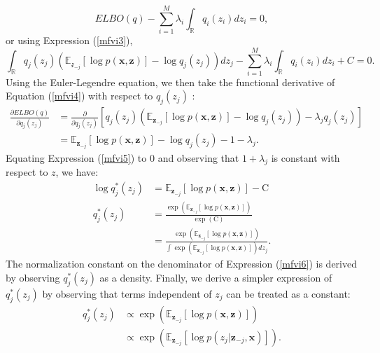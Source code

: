 \documentclass[honours,12pt]{unswthesis}
\newcommand{\R}{\mathbb{R}}
\numberwithin{equation}{section}
\theoremstyle{definition}
\begin{document}
\begin{equation*}
ELBO(q)-\sum^M_{i=1}\lambda_i\int_\R q_i(z_i)dz_i=0,
\end{equation*}
or using Expression (\ref{mfvi3}),
\begin{equation}
\int_\R q_j(z_j)\left(\mathbb{E}_{\mathcal{z}_{-j}}[\log p(\bm{x},\bm{z})]-\log q_j(z_j)\right)dz_j-\sum^M_{i=1}\lambda_i\int_\R q_i(z_i)dz_i+C=0. \label{mfvi4}
\end{equation} 
Using the Euler-Legendre equation, we then take the functional derivative of Equation (\ref{mfvi4}) with respect to $q_j(z_j)$ \citep{pattern}:
\begin{align}
\frac{\partial ELBO(q)}{\partial q_j(z_j)}&= \frac{\partial}{\partial q_j(z_j)}\left[q_j(z_j)\left(\mathbb{E}_{\bm{z}_{-j}}[\log p(\bm{x},\bm{z})]-\log q_j(z_j)\right)-\lambda_jq_j(z_j)\right]\nonumber
\\&= \mathbb{E}_{\bm{z}_{-j}}[\log p(\bm{x},\bm{z})]-\log q_j(z_j)-1-\lambda_j.\label{mfvi5}
\end{align}
Equating Expression (\ref{mfvi5}) to 0 and observing that $1+\lambda_j$ is constant with respect to $z$, we have:
\begin{align}
\log q_j^*(z_j)&= \mathbb{E}_{\bm{z}_{-j}}[\log p(\bm{x},\bm{z})]-\text{C} \nonumber\\
q_j^*(z_j)&=\frac{\exp(\mathbb{E}_{\bm{z}_{-j}}[\log p(\bm{x},\bm{z})])}{\exp{(\text{C})}}\nonumber\\
&= \frac{\exp(\mathbb{E}_{\bm{z}_{-j}}[\log p(\bm{x},\bm{z})])}{\int \exp(\mathbb{E}_{\bm{z}_{-j}}[\log p(\bm{x},\bm{z})])dz_j}.\label{mfvi6}
\end{align}
The normalization constant on the denominator of Expression (\ref{mfvi6}) is derived by observing $q^*_j(z_j)$ as a density. Finally, we derive a simpler expression of $q^*_j(z_j)$ by observing that terms independent of $z_j$ can be treated as a constant:
\begin{align}
q^*_j(z_j)&\propto \exp\left(\mathbb{E}_{\bm{z}_{-j}}[\log p(\bm{x},\bm{z})]\right)\nonumber\\
&\propto \exp\left(\mathbb{E}_{\bm{z}_{-j}}[\log p(z_j|\bm{z}_{-j},\bm{x})]\right).
\end{align}
\end{document}
